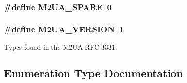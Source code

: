 \subsubsection[{M2\+U\+A\+\_\+\+S\+P\+A\+RE}]{\setlength{\rightskip}{0pt plus 5cm}\#define M2\+U\+A\+\_\+\+S\+P\+A\+RE~0}\label{m2ua__types_8h_a9554a94632be12fdadead670a989aa87}
\subsubsection[{M2\+U\+A\+\_\+\+V\+E\+R\+S\+I\+ON}]{\setlength{\rightskip}{0pt plus 5cm}\#define M2\+U\+A\+\_\+\+V\+E\+R\+S\+I\+ON~1}\label{m2ua__types_8h_ab49fe56cee1638e162484699a5249ab7}


Types found in the M2\+UA R\+FC 3331. 



\subsection{Enumeration Type Documentation}
